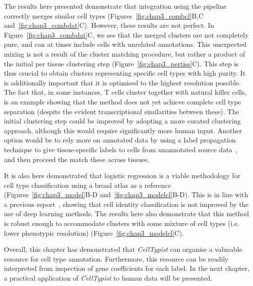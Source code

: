 The results here presented demonstrate that integration using the pipeline correctly merges similar cell types (Figures~\ref{fig:chap3_combcl}B,C and~\ref{fig:chap3_combdat}C). However, these results are not perfect. In Figure~\ref{fig:chap3_combdat}C, we see that the merged clusters are not completely pure, and can at times include cells with unrelated annotations. This unexpected mixing is not a result of the cluster matching procedure, but rather a product of the initial per tissue clustering step (Figure~\ref{fig:chap3_pertiss}C). This step is thus crucial to obtain clusters representing specific cell types with high purity. It is additionally important that it is optimised to the highest resolution possible. The fact that, in some instances, T cells cluster together with natural killer cells, is an example showing that the method does not yet achieve complete cell type separation (despite the evident transcriptional similarities between these). The initial clustering step could be improved by adopting a more curated clustering approach, although this would require significantly more human input. Another option would be to rely more on annotated data by using a label propagation technique to give tissue-specific labels to cells from unannotated source data~\citep{barkas_joint_2019}, and then proceed the match these across tissues.

It is also here demonstrated that logistic regression is a viable methodology for cell type classification using a broad atlas as a reference (Figures~\ref{fig:chap3_model}B-D and~\ref{fig:chap3_modelcl}B-D). This is in line with a previous report~\citep{kohler_deep_2019}, showing that cell identity classification is not improved by the use of deep learning methods. The results here also demonstrate that this method is robust enough to accommodate clusters with some mixture of cell types (i.e. lower phenotypic resolution) (Figure~\ref{fig:chap3_modelcl}C).

Overall, this chapter has demonstrated that \textit{CellTypist} can organise a valueable resource for cell type annotation. Furthermore, this resource can be readily interpreted from inspection of gene coefficients for each label. In the next chapter, a practical application of \textit{CellTypist} to human data will be presented.